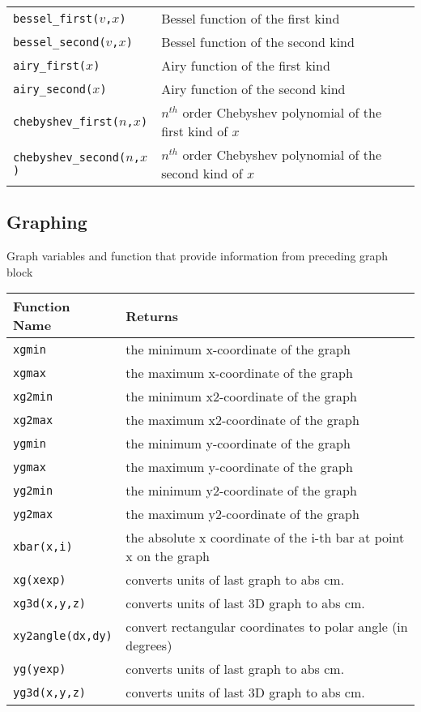 \begin{supertabular}{ll}
{\tt bessel\_first($v$,$x$)}      	   & Bessel function of the first kind \\
{\tt bessel\_second($v$,$x$)}         & Bessel function of the second kind \\
{\tt airy\_first($x$)}      	           & Airy function of the first kind \\
{\tt airy\_second($x$)}      	       & Airy function of the second kind \\
{\tt chebyshev\_first($n$,$x$)}       & $n^{th}$ order Chebyshev polynomial of the first kind of $x$  \\
{\tt chebyshev\_second($n$,$x$)}     & $n^{th}$ order Chebyshev polynomial of the second kind of $x$  \\
\end{supertabular}


\subsection{Graphing}

Graph variables and function that provide information from preceding graph block

\begin{supertabular}{ll} \hline
Function Name     & Returns  \\ \hline
{\tt xgmin}  & the minimum x-coordinate of the graph \\
{\tt xgmax}  & the maximum x-coordinate of the graph \\
{\tt xg2min}  & the minimum x2-coordinate of the graph \\
{\tt xg2max}  & the maximum x2-coordinate of the graph \\
{\tt ygmin}  & the minimum y-coordinate of the graph \\
{\tt ygmax}  & the maximum y-coordinate of the graph \\
{\tt yg2min}  & the minimum y2-coordinate of the graph \\
{\tt yg2max}  & the maximum y2-coordinate of the graph \\
{\tt xbar(x,i)}         	& the absolute x coordinate of the i-th bar at point x on the graph \\
{\tt xg(xexp)}              & converts units of last graph to abs cm. \\
{\tt xg3d(x,y,z)}         & converts units of last 3D graph to abs cm. \\
{\tt xy2angle(dx,dy)} & convert rectangular coordinates to polar angle (in degrees)\\
{\tt yg(yexp)}              & converts units of last graph to abs cm. \\
{\tt yg3d(x,y,z)}         & converts units of last 3D graph to abs cm. \\

\end{supertabular}

